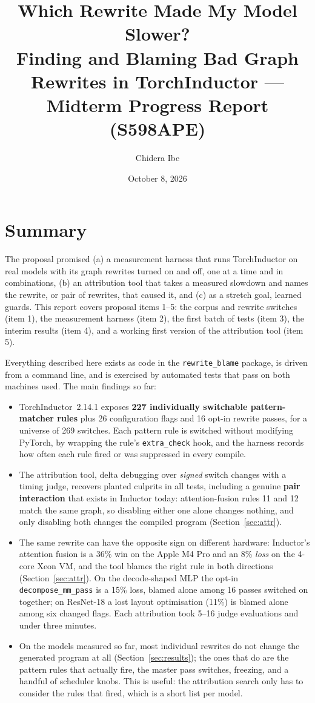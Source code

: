 \documentclass[11pt]{article}
\title{Which Rewrite Made My Model Slower?\\
\large Finding and Blaming Bad Graph Rewrites in TorchInductor --- Midterm Progress Report (S598APE)}
\author{Chidera Ibe}
\date{October 8, 2026}
\newcommand{\code}[1]{\texttt{#1}}
\begin{document}
\maketitle

\section{Summary}
The proposal promised (a) a measurement harness that runs TorchInductor on real models with its
graph rewrites turned on and off, one at a time and in combinations, (b) an attribution tool that
takes a measured slowdown and names the rewrite, or pair of rewrites, that caused it, and (c) as a
stretch goal, learned guards. This report covers proposal items 1--5: the corpus and rewrite
switches (item 1), the measurement harness (item 2), the first batch of tests (item 3), the
interim results (item 4), and a working first version of the attribution tool (item 5).

Everything described here exists as code in the \code{rewrite\_blame} package, is driven from a
command line, and is exercised by automated tests that pass on both
machines used. The main findings so far:
\begin{itemize}
\item TorchInductor~2.14.1 exposes \textbf{227 individually switchable pattern-matcher rules} plus
  26 configuration flags and 16 opt-in rewrite passes, for a universe of 269 switches. Each pattern
  rule is switched without modifying PyTorch, by wrapping the rule's \code{extra\_check} hook, and the
  harness records how often each rule fired or was suppressed in every compile.
\item The attribution tool, delta debugging over \emph{signed} switch changes with a timing judge,
  recovers planted culprits in all tests, including a genuine \textbf{pair interaction} that exists
  in Inductor today: attention-fusion rules 11 and 12 match the same graph, so disabling either one
  alone changes nothing, and only disabling both changes the compiled program (Section~\ref{sec:attr}).
\item The same rewrite can have the opposite sign on different hardware: Inductor's
  attention fusion is a 36\% win on the Apple M4 Pro and an 8\% \emph{loss} on the 4-core Xeon
  VM, and the tool blames the right rule in both directions (Section~\ref{sec:attr}). On the
  decode-shaped MLP the opt-in \code{decompose\_mm\_pass} is a 15\% loss, blamed alone among 16
  passes switched on together; on ResNet-18 a lost layout optimisation (11\%) is blamed alone
  among six changed flags. Each attribution took 5--16 judge evaluations and under three minutes.
\item On the models measured so far, most individual rewrites do not change the generated program
  at all (Section~\ref{sec:results}); the ones that do are the pattern rules that actually fire,
  the master pass switches, freezing, and a handful of scheduler knobs. This is useful: the
  attribution search only has to consider the rules that fired, which is a short list per model.
\end{itemize}
\end{document}
